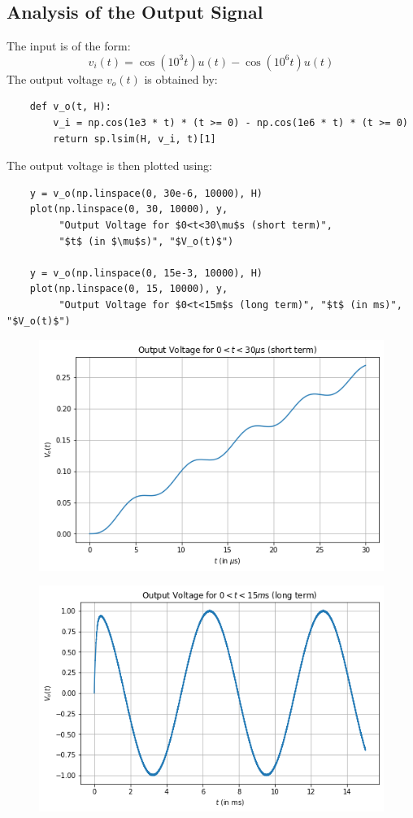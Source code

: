 \documentclass[12pt, a4paper]{article}
\begin{document}
\subsection{Analysis of the Output Signal}
The input is of the form:
\[v_i(t) = \cos{(10^3t)}u(t) - \cos{(10^6t)}u(t)\]
The output voltage $v_o(t)$ is obtained by:
\begin{lstlisting}
    def v_o(t, H):
        v_i = np.cos(1e3 * t) * (t >= 0) - np.cos(1e6 * t) * (t >= 0)
        return sp.lsim(H, v_i, t)[1]
\end{lstlisting}

The output voltage is then plotted using:
\begin{lstlisting}
    y = v_o(np.linspace(0, 30e-6, 10000), H)
    plot(np.linspace(0, 30, 10000), y,
         "Output Voltage for $0<t<30\mu$s (short term)",
         "$t$ (in $\mu$s)", "$V_o(t)$")

    y = v_o(np.linspace(0, 15e-3, 10000), H)
    plot(np.linspace(0, 15, 10000), y,
         "Output Voltage for $0<t<15m$s (long term)", "$t$ (in ms)", "$V_o(t)$")
\end{lstlisting}
\begin{figure}[H]
    \centering
    \includegraphics[scale=0.6]{6a.png}
\end{figure}
\begin{figure}[H]
    \centering
    \includegraphics[scale=0.6]{6b.png}
\end{figure}
\end{document}
